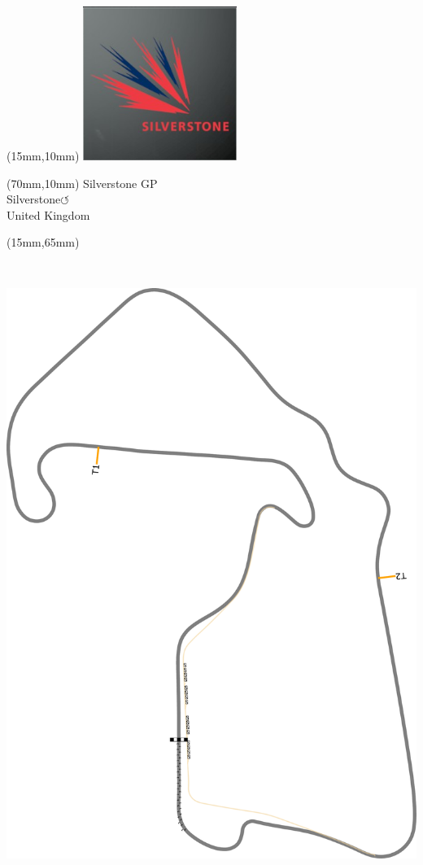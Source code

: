 \null\newpage
\begin{textblock*}{50mm}(15mm,10mm)%
\includegraphics[width=50mm]{LG/2015-05-20_00094.png}
\end{textblock*}
\begin{textblock*}{130mm}(70mm,10mm)%
{\fontsize{20}{20}\selectfont Silverstone GP\\}
{\fontsize{16}{16}\selectfont Silverstone\hfill \huge$\circlearrowleft$\\}
{\fontsize{12}{12}\selectfont United Kingdom\\}
\end{textblock*}
\begin{textblock*}{185mm}(15mm,65mm)%
\centering
\mbox{\includegraphics[width=185mm,height=210mm,keepaspectratio]{PT/SIGP.pdf}}
\end{textblock*}

